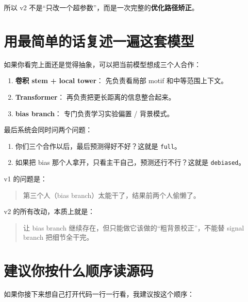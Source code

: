 \documentclass[11pt,a4paper]{ctexart}
\begin{document}
所以 v2 不是“只改一个超参数”，而是一次完整的\textbf{优化路径矫正}。

\section{用最简单的话复述一遍这套模型}

如果你看完上面还是觉得抽象，可以把当前模型想成三个人合作：

\begin{enumerate}[leftmargin=2em]
\item \textbf{卷积 stem + local tower}：
  先负责看局部 motif 和中等范围上下文。
\item \textbf{Transformer}：
  再负责把更长距离的信息整合起来。
\item \textbf{bias branch}：
  专门负责学习实验偏置 / 背景模式。
\end{enumerate}

最后系统会同时问两个问题：

\begin{enumerate}[leftmargin=2em]
\item 你们三个合作以后，最后预测得好不好？这就是 \texttt{full}。
\item 如果把 bias 那个人拿开，只看主干自己，预测还行不行？这就是 \texttt{debiased}。
\end{enumerate}

v1 的问题是：

\begin{quote}
第三个人（bias branch）太能干了，结果前两个人偷懒了。
\end{quote}

v2 的所有改动，本质上就是：

\begin{quote}
让 bias branch 继续存在，但只能做它该做的“粗背景校正”，不能替 signal branch 把细节全干完。
\end{quote}

\section{建议你按什么顺序读源码}

如果你接下来想自己打开代码一行一行看，我建议按这个顺序：
\end{document}
